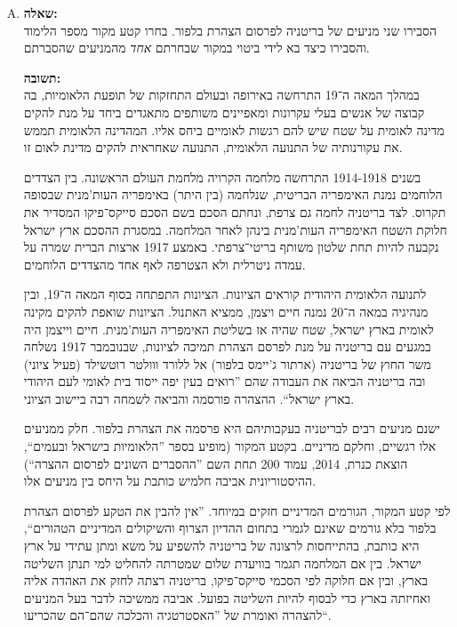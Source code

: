 \documentclass[a4paper]{article}
\newcommand\hl[1]   {#1}
\begin{document}
\begin{enumerate}[A.]
			לסיום, יש חשיבות רבה להצהרת בלפור בעבור התנועה הציונית, החל מהיקרבות להשגת הסדר ואישור ממשי מול הכוח שולט בא''י להקים מדינה לאומית, וכלה בחיזוק ואיחוד התנועה הציונית. 
			
			\item \textbf{שאלה: }\\
			הסבירו שני מניעים של בריטניה לפרסום הצהרת בלפור. בחרו קטע מקור מספר הלימוד והסבירו כיצד בא לידי ביטוי במקור שבחרתם \textit{אחד} מהמניעים שהסברתם. 
			
			\textbf{תשובה: }\\
			במהלך המאה ה־19 התרחשה באירופה ובעולם התחזקות של תופעת ה\hl{לאומיות}, בה קבוצה של אנשים בעלי עקרונות ומאפיינים משותפים מתאגדים ביחד על מנת להקים \hl{מדינה לאומית} על שטח שיש להם רגשות לאומיים ביחס אליו. המהדינה הלאומית תממש את עקורנותיה של ה\hl{תנועה הלאומית}, התנועה שאחראית להקים מדינת לאום זו. 
			
			בשנים 1914-1918 התרחשה מלחמה הקרויה \hl{מלחמת העולם הראשונה}. בין הצדדים הלוחמים נמנת האימפריה הבריטית, שנלחמה (בין היתר) באימפריה העות'מנית שבסופה תקרוס. לצד בריטניה לחמה גם צרפת, ונחתם הסכם בשם \hl{הסכם סייקס־פיקו} המסדיר את חלוקת השטח האימפריה העות'מנית בינהן לאחר המלחמה. במסגרת ההסכם ארץ ישראל נקבעה להיות תחת שלטון משותף בריטי־צרפתי. באמצע 1917 ארצות הברית שמרה על עמדה ניטרלית ולא הצטרפה לאף אחד מהצדדים הלוחמים. 
			
			לתנועה הלאומית היהודית קוראים \hl{הציונות}. הציונות התפתחה בסוף המאה ה־19, ובין מנהיגיה במאה ה־20 נמנה \hl{חיים ויצמן}, ממציא האתנול. הציונות שואפת להקים מקינה לאומית בארץ ישראל, שטח שהיה אז בשליטת האימפריה העות'מנית. חיים וייצמן היה במגעים עם בריטניה על מנת לפרסם הצהרת תמיכה לציונות, שבנובמבר 1917 נשלחה משר החוץ של בריטניה (ארתור ג'יימס בלפור) אל ללורד ווולטר רוטשילד (פעיל ציוני) ובה בריטניה הביאה את העבודה שהם ''רואים בעין יפה ייסוד בית לאומי לעם היהודי בארץ ישראל``. ההצהרה פורסמה והביאה לשמחה רבה ביישוב הציוני. 
			
			ישנם מניעים רבים לבריטניה בעקבותיהם היא פרסמה את הצהרת בלפור. חלק ממניעים אלו רגשיים, וחלקם מדיניים. בקטע המקור (מופיע בספר ''הלאומיות בישראל ובעמים``, הוצאת כנרת, 2014, עמוד 200 תחת השם ''ההסברים השונים לפרסום ההצרה``) ההיסטוריונית אביבה חלמיש כותבת על היחס בין מניעים אלו. 
			
			לפי קטע המקור, הגורמים המדיניים חזקים במיוחד. ''אין להבין את הטקע לפרסום הצהרת בלפור בלא גורמים שאינם לגמרי בתחום ההדיון הצרוף והשיקולים המדיניים הטהורים``, היא כותבת, בהתייחסות לרצונה של בריטניה להשפיע על משא ומתן עתידי על ארץ ישראל. בין אם המלחמה תגמר בוויעדת שלום שמטרתה להחליט למי תנתן השליטה בארץ, ובין אם חלוקה לפי הסכמי סייקס־פיקו, בריטניה רצתה לחזק את האהדה אליה ואחיזתה בארץ כדי לבסוף להיות השליטה בפועל. אביבה ממשיכה לדבר בעל המניעים להצהרה ואומרת של ''האסטרטגיה והכלכה שהם־הם שהכריעו``. 
			

\end{enumerate}
\end{document}
